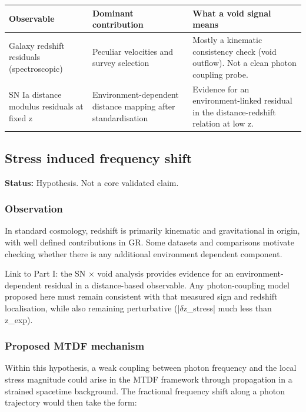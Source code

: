 \documentclass[11pt,a4paper]{article}
\begin{document}
\begin{table}[H]
\centering
\footnotesize
\begin{tabularx}{\linewidth}{l>{\RaggedRight\arraybackslash}X>{\RaggedRight\arraybackslash}X}
\toprule
\textbf{Observable} & \textbf{Dominant contribution} & \textbf{What a void signal means} \tabularnewline
\midrule
Galaxy redshift residuals (spectroscopic) & Peculiar velocities and survey selection & Mostly a kinematic consistency check (void outflow). Not a clean photon coupling probe. \tabularnewline
SN Ia distance modulus residuals at fixed z & Environment-dependent distance mapping after standardisation & Evidence for an environment-linked residual in the distance-redshift relation at low z. \tabularnewline
\bottomrule
\end{tabularx}
\end{table}

\subsection{Stress induced frequency shift}
\begin{mdframed}[linecolor=accent,linewidth=0.5pt,backgroundcolor=callout-bg,leftline=true,rightline=true,topline=true,bottomline=true,innerleftmargin=8pt,innerrightmargin=8pt,innertopmargin=6pt,innerbottommargin=6pt]
\textbf{Status:} Hypothesis. Not a core validated claim.
\end{mdframed}

\subsubsection{Observation}
In standard cosmology, redshift is primarily kinematic and gravitational in origin, with well defined contributions in GR. Some datasets and comparisons motivate checking whether there is any additional environment dependent component.

Link to Part I: the SN $\times$ void analysis provides evidence for an environment-dependent residual in a distance-based observable. Any photon-coupling model proposed here must remain consistent with that measured sign and redshift localisation, while also remaining perturbative (|$\delta$z\_\allowbreak{}stress| much less than z\_\allowbreak{}exp).

\subsubsection{Proposed MTDF mechanism}
Within this hypothesis, a weak coupling between photon frequency and the local stress magnitude could arise in the MTDF framework through propagation in a strained spacetime background. The fractional frequency shift along a photon trajectory would then take the form:
\end{document}
